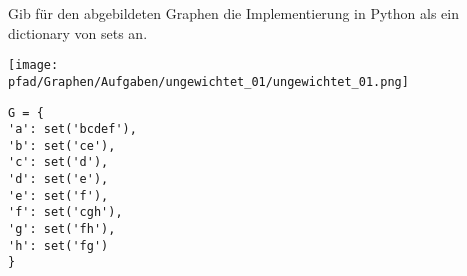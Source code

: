 ﻿\question[3]
Gib für den abgebildeten Graphen die Implementierung in Python als
ein dictionary von sets an.

\texttt{[image: \\pfad/Graphen/Aufgaben/ungewichtet\_01/ungewichtet\_01.png]}
\begin{solutionbox}{5cm}
\begin{lstlisting}
G = {
'a': set('bcdef'),
'b': set('ce'),
'c': set('d'),
'd': set('e'),
'e': set('f'),
'f': set('cgh'),
'g': set('fh'),
'h': set('fg')
}
\end{lstlisting}
\end{solutionbox}
